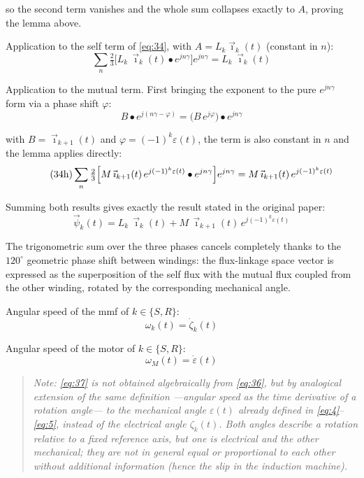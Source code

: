 \documentclass[11pt,a4paper]{article}
\begin{document}
so the second term vanishes and the whole sum collapses exactly to $A$, proving the lemma above.

Application to the self term of \eqref{eq:34}, with $A=L_k\vec\imath_k(t)$ (constant in $n$):
\begin{equation}\tag{34f}\label{eq:34f}
\sum_n \tfrac23\bigl[L_k\,\vec\imath_k(t)\bullet e^{jn\gamma}\bigr]e^{jn\gamma} = L_k\,\vec\imath_k(t)
\end{equation}

Application to the mutual term. First bringing the exponent to the pure $e^{jn\gamma}$ form via a phase shift $\varphi$:
\begin{equation}\tag{34g}\label{eq:34g}
B\bullet e^{j(n\gamma-\varphi)} = \bigl(B\,e^{j\varphi}\bigr)\bullet e^{jn\gamma}
\end{equation}

with $B=\vec\imath_{k+1}(t)$ and $\varphi=(-1)^k\varepsilon(t)$, the term is also constant in $n$ and the lemma applies directly:
\begin{equation}\tag{34h}\label{eq:34h}
\sum_n \tfrac23\Bigl[M\,\vec\imath_{k+1}(t)\,e^{j(-1)^k\varepsilon(t)}\bullet e^{jn\gamma}\Bigr]e^{jn\gamma} = M\,\vec\imath_{k+1}(t)\,e^{j(-1)^k\varepsilon(t)}
\end{equation}

Summing both results gives exactly the result stated in the original paper:
\begin{equation}\tag{35}\label{eq:35}
\vec\psi_k(t) = L_k\,\vec\imath_k(t) + M\,\vec\imath_{k+1}(t)\,e^{j(-1)^k\varepsilon(t)}
\end{equation}

The trigonometric sum over the three phases cancels completely thanks to the $120^\circ$ geometric phase shift between windings: the flux-linkage space vector is expressed as the superposition of the self flux with the mutual flux coupled from the other winding, rotated by the corresponding mechanical angle.

Angular speed of the mmf of $k\in\{S,R\}$:
\begin{equation}\tag{36}\label{eq:36}
\omega_k(t) = \dot\zeta_k(t)
\end{equation}

Angular speed of the motor of $k\in\{S,R\}$:
\begin{equation}\tag{37}\label{eq:37}
\omega_M(t) = \dot\varepsilon(t)
\end{equation}

\begin{quote}\emph{Note: \eqref{eq:37} is not obtained algebraically from \eqref{eq:36}, but by analogical extension of the same definition ---angular speed as the time derivative of a rotation angle--- to the mechanical angle $\varepsilon(t)$ already defined in \eqref{eq:4}--\eqref{eq:5}, instead of the electrical angle $\zeta_k(t)$. Both angles describe a rotation relative to a fixed reference axis, but one is electrical and the other mechanical; they are not in general equal or proportional to each other without additional information (hence the slip in the induction machine).}\end{quote}
\end{document}
